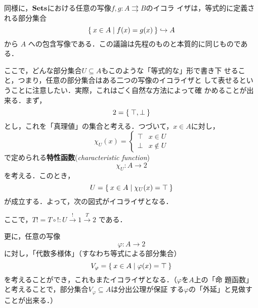 \begin{example}
 同様に，$\mathbf{Sets}$における任意の写像$f, g: A \rightrightarrows B$のイコラ
 イザは，等式的に定義される部分集合
 \[
  \Set{ x \in A | f(x) = g(x)} \hookrightarrow A
 \]
 から $A$ への包含写像である．この議論は先程のものと本質的に同じものであ
 る．

 ここで，どんな部分集合$U \subseteq A$もこのような「等式的な」形で書き下
 せること，つまり，任意の部分集合はある二つの写像のイコライザと
 して表せるということに注意したい．実際，これはごく自然な方法によって確
 かめることが出来る．まず，
 \[
  2 = \Set{\top, \bot}
 \]
 とし，これを「真理値」の集合と考える．つづいて，$x \in A$に対し，
 \[
  \chi_U(x) = \begin{cases}
	       \top & x \in U\\
	       \bot & x \notin U
	      \end{cases}
 \]
 で定められる{\bfseries 特性函数}({\itshape characteristic function})
 \[
  \chi_U : A \to 2
 \]
 を考える．このとき，
 \[
  U = \Set{x \in A | \chi_U(x) = \top}
 \]
 が成立する．よって，次の図式がイコライザとなる．
 \begin{center}
 \end{center}
 ここで，$T! = T \circ ! : U \xrightarrow{!} 1 \xrightarrow{T} 2$ である．

 更に，任意の写像
 \[
  \varphi : A \to 2
 \]
 に対し，「代数多様体」（すなわち等式による部分集合）
 \[
  V_\varphi = \Set{ x \in A | \varphi(x) = \top}
 \]
 を考えることができ，これもまたイコライザとなる．（$\varphi$を$A$上の「命
 題函数」と考えることで，部分集合$V_\varphi \subseteq A$は分出公理が保証
 する$\varphi$の「外延」と見做すことが出来る．）


\end{example}
